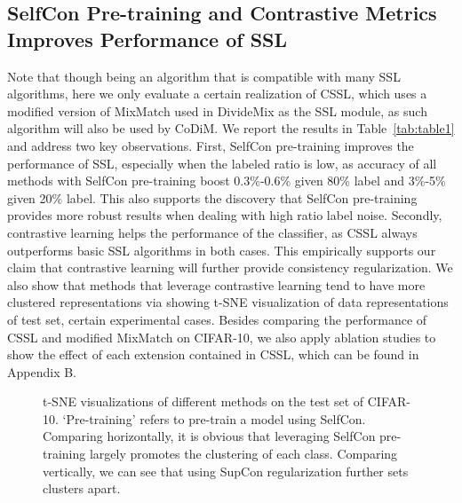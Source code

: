\documentclass[letterpaper]{article} \usepackage{aaai22}  \usepackage{times}  \usepackage{helvet}  \usepackage{courier}  \usepackage[hyphens]{url}  \usepackage{graphicx} \usepackage{subfigure}
\begin{document}
\subsection{SelfCon Pre-training and Contrastive Metrics Improves Performance of SSL}
Note that though being an algorithm that is compatible with many SSL algorithms, here we only evaluate a certain realization of CSSL, which uses a modified version of MixMatch used in DivideMix as the SSL module, as such algorithm will also be used by CoDiM. We report the results in Table~\ref{tab:table1} and address two key observations. First, SelfCon pre-training improves the performance of SSL, especially when the labeled ratio is low, as accuracy of all methods with SelfCon pre-training boost 0.3\%-0.6\% given 80\% label and 3\%-5\% given 20\% label. This also supports the discovery that SelfCon pre-training provides more robust results when dealing with high ratio label noise. Secondly, contrastive learning helps the performance of the classifier, as CSSL always outperforms basic SSL algorithms in both cases. This empirically supports our claim that contrastive learning will further provide consistency regularization. We also show that methods that leverage contrastive learning tend to have more clustered representations via showing t-SNE visualization of data representations of test set, certain experimental cases. Besides comparing the performance of CSSL and modified MixMatch on CIFAR-10, we also apply ablation studies to show the effect of each extension contained in CSSL, which can be found in Appendix B.
\begin{figure}[htbp]
\centering
{}
\quad
{}
\quad
{}
\quad
{}
\caption{t-SNE visualizations of different methods on the test set of CIFAR-10. `Pre-training' refers to pre-train a model using SelfCon. Comparing horizontally, it is obvious that leveraging SelfCon pre-training largely promotes the clustering of each class. Comparing vertically, we can see that using SupCon regularization further sets clusters apart. }
\end{figure}
\end{document}
